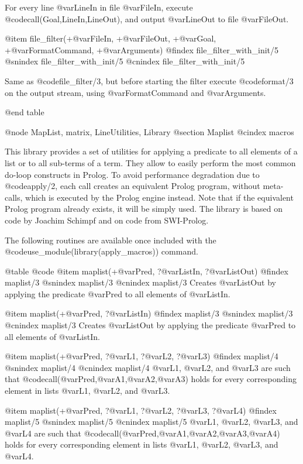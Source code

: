 {{{{{{{{{For every line @var{LineIn} in file @var{FileIn}, execute
@code{call(Goal,LineIn,LineOut)}, and output @var{LineOut} to file
@var{FileOut}.

@item file_filter(+@var{FileIn}, +@var{FileOut}, +@var{Goal},
+@var{FormatCommand},   +@var{Arguments})
@findex file_filter_with_init/5
@snindex file_filter_with_init/5
@cnindex file_filter_with_init/5

Same as @code{file_filter/3}, but before starting the filter execute
@code{format/3} on the output stream, using @var{FormatCommand} and
@var{Arguments}.

@end table



@node MapList, matrix, LineUtilities, Library
@section Maplist
@cindex macros

This library provides a set of utilities for applying a predicate to
all elements of a list or to all sub-terms of a term. They allow to
easily perform the most common do-loop constructs in Prolog. To avoid
performance degradation due to @code{apply/2}, each call creates an
equivalent Prolog program, without meta-calls, which is executed by
the Prolog engine instead. Note that if the equivalent Prolog program
already exists, it will be simply used. The library is based on code
by Joachim Schimpf and on code from SWI-Prolog.

The following routines are available once included with the
@code{use_module(library(apply_macros))} command.

@table @code
@item maplist(+@var{Pred}, ?@var{ListIn}, ?@var{ListOut})
@findex maplist/3
@snindex maplist/3
@cnindex maplist/3
      Creates @var{ListOut} by applying the predicate @var{Pred} to all
elements of @var{ListIn}.

@item maplist(+@var{Pred}, ?@var{ListIn})
@findex maplist/3
@snindex maplist/3
@cnindex maplist/3
      Creates @var{ListOut} by applying the predicate @var{Pred} to all
elements of @var{ListIn}.

@item maplist(+@var{Pred}, ?@var{L1}, ?@var{L2}, ?@var{L3})
@findex maplist/4
@snindex maplist/4
@cnindex maplist/4
      @var{L1},  @var{L2}, and @var{L3} are such that
      @code{call(@var{Pred},@var{A1},@var{A2},@var{A3})} holds for every
      corresponding element in lists @var{L1},  @var{L2}, and @var{L3}.

@item maplist(+@var{Pred}, ?@var{L1}, ?@var{L2}, ?@var{L3}, ?@var{L4})
@findex maplist/5
@snindex maplist/5
@cnindex maplist/5
      @var{L1}, @var{L2}, @var{L3}, and @var{L4} are such that
      @code{call(@var{Pred},@var{A1},@var{A2},@var{A3},@var{A4})} holds
      for every corresponding element in lists @var{L1}, @var{L2}, @var{L3}, and
      @var{L4}.

}}}}}}}}}
